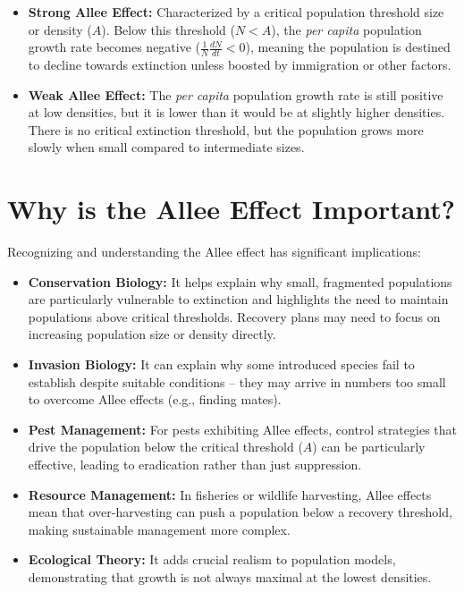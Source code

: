 \documentclass{article}
\begin{document}
\begin{itemize}
    \item \textbf{Strong Allee Effect:} Characterized by a critical population threshold size or density ($A$). Below this threshold ($N < A$), the \emph{per capita} population growth rate becomes negative ($\frac{1}{N}\frac{dN}{dt} < 0$), meaning the population is destined to decline towards extinction unless boosted by immigration or other factors.
    \item \textbf{Weak Allee Effect:} The \emph{per capita} population growth rate is still positive at low densities, but it is lower than it would be at slightly higher densities. There is no critical extinction threshold, but the population grows more slowly when small compared to intermediate sizes.
\end{itemize}

\section{Why is the Allee Effect Important?}

Recognizing and understanding the Allee effect has significant implications:

\begin{itemize}
    \item \textbf{Conservation Biology:} It helps explain why small, fragmented populations are particularly vulnerable to extinction and highlights the need to maintain populations above critical thresholds. Recovery plans may need to focus on increasing population size or density directly.
    \item \textbf{Invasion Biology:} It can explain why some introduced species fail to establish despite suitable conditions – they may arrive in numbers too small to overcome Allee effects (e.g., finding mates).
    \item \textbf{Pest Management:} For pests exhibiting Allee effects, control strategies that drive the population below the critical threshold ($A$) can be particularly effective, leading to eradication rather than just suppression.
    \item \textbf{Resource Management:} In fisheries or wildlife harvesting, Allee effects mean that over-harvesting can push a population below a recovery threshold, making sustainable management more complex.
    \item \textbf{Ecological Theory:} It adds crucial realism to population models, demonstrating that growth is not always maximal at the lowest densities.
\end{itemize}
\end{document}
